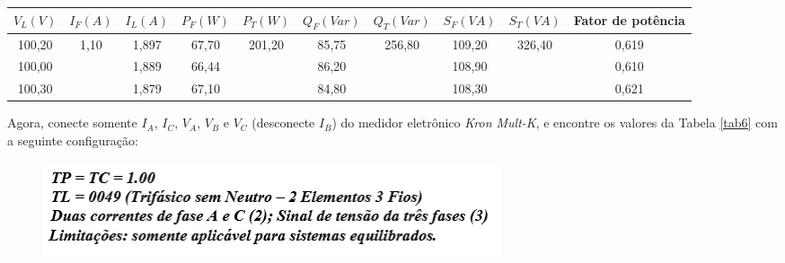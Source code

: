 \documentclass[a4paper,12pt,oneside,openany,table,xcdraw]{article}
\begin{document}
\begin{table}[H]\scriptsize
\centering
\def\arraystretch{1.35}
\captionsetup{font=scriptsize}
 \label{tab5}

\begin{tabular}{|c|c|c|c|c|c|c|c|c|c|}
\hline
$V_{L} (V)$ & $I_{F} (A)$           & $I_{L} (A)$ & $P_{F} (W)$ & $P_{T} (W)$             & $Q_{F} (Var)$ & $Q_{T} (Var)$           & $S_{F} (VA)$ & $S_{T} (VA)$            & Fator de potência \\ \hline
100,20      & \multirow{3}{*}{1,10} & 1,897       & 67,70       & \multirow{3}{*}{201,20} & 85,75         & \multirow{3}{*}{256,80} & 109,20       & \multirow{3}{*}{326,40} & 0,619             \\ \cline{1-1} \cline{3-4} \cline{6-6} \cline{8-8} \cline{10-10} 
100,00       &                       & 1,889       & 66,44       &                         & 86,20         &                         & 108,90       &                         & 0,610             \\ \cline{1-1} \cline{3-4} \cline{6-6} \cline{8-8} \cline{10-10} 
100,30      &                       & 1,879       & 67,10       &                         & 84,80         &                         & 108,30       &                         & 0,621             \\ \hline
\end{tabular}
\end{table}

Agora, conecte somente $I_A$, $I_C$, $V_A$, $V_B$ e $V_C$ (desconecte $I_B$) do medidor
eletrônico \emph{Kron Mult-K}, e encontre os valores da Tabela \ref{tab6} com a seguinte
configuração:
\begin{figure}[H]
\centering
\captionsetup{font=scriptsize}
\includegraphics[width=13.5cm]{parametros4}
\end{figure}
\end{document}
